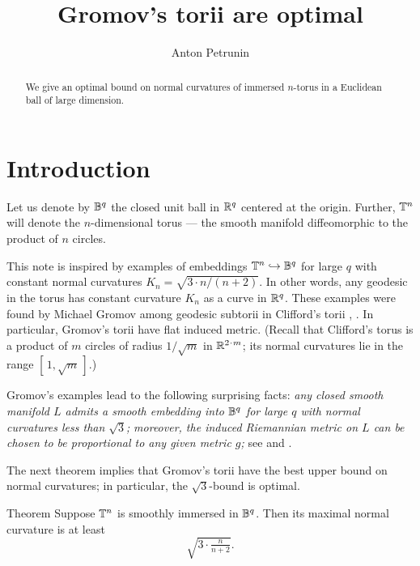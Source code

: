 \documentclass[a4paper,10pt]{article}
\def\thetitle{Gromov's torii are optimal}
\def\theauthors{Anton Petrunin}
\begin{document}


\title{\thetitle}
\author{\theauthors}
\date{}
\maketitle

\begin{abstract}
We give an optimal bound on normal curvatures of immersed $n$-torus in a Euclidean ball of large dimension. 
\end{abstract}

\section{Introduction}

Let us denote by $\mathbb{B}^q$ the closed unit ball in $\mathbb{R}^q$ centered at the origin.
Further, $\mathbb{T}^n$ will denote the $n$-dimensional torus --- the smooth manifold diffeomorphic to the product of $n$ circles.

This note is inspired by examples of embeddings $\mathbb{T}^n\hookrightarrow\mathbb{B}^q$ for large $q$ with constant normal curvatures $K_n=\sqrt{3\cdot n/(n+2)}$.
In other words, any geodesic in the torus has constant curvature $K_n$ as a curve in $\mathbb{R}^q$.
These examples were found by Michael Gromov among geodesic subtorii in Clifford's torii 
\cite[2.A]{gromov3}, \cite[1.1.A.]{gromov2}.
In particular, Gromov's torii have flat induced metric.
(Recall that Clifford's torus is a product of $m$  circles of radius ${1}/{\sqrt{m}}$ in $\RR^{2\cdot m}$;
its normal curvatures lie in the range $[\,1,\sqrt{m}\,]$.)


Gromov's examples lead to the following surprising facts:
\textit{any closed smooth manifold $L$ admits a smooth embedding into $\mathbb{B}^q$ for large $q$ with normal curvatures less than $\sqrt{3}$;}
\textit{moreover, the induced Riemannian metric on $L$ can be chosen to be proportional to any given metric $g$;}
see \cite[1.D]{gromov3} and \cite[1.1.C]{gromov2}.

The next theorem implies that Gromov's torii have the best upper bound on normal curvatures;
in particular, the $\sqrt3$-bound is optimal.

\begin{thm}{Theorem}
\label{thm:main}
Suppose $\mathbb{T}^n$ is smoothly immersed in $\mathbb{B}^q$.
Then its maximal normal curvature is at least 
\[\sqrt{3\cdot \tfrac{n}{n+2}}.\]
\end{thm}
\end{document}
